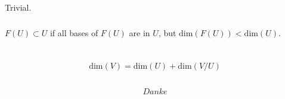 \documentclass{report}
\newcommand{\dim}{\textrm{dim}}
\begin{document}
\section{}

\subsection{}
Trivial.

\subsection{}

$F(U)\subset U$ if all bases of $F(U)$ are in $U$, but $\dim(F(U))< \dim(U)$.

\chapter{}

\section{}

$$\dim(V)=\dim(U)+\dim(V/U)$$

\section{}

$$Danke$$

\subsection{}

\subsection{}

\subsection{}

\subsection{}

\section{}
\end{document}
